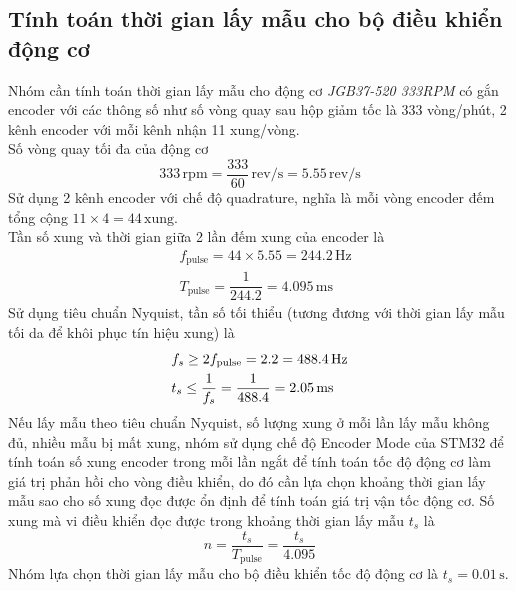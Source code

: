           \subsection{Tính toán thời gian lấy mẫu cho bộ điều khiển động cơ}
               \hspace*{0.6cm}Nhóm cần tính toán thời gian lấy mẫu cho động cơ \textit{JGB37-520 333RPM} có gắn encoder với các thông số như số vòng quay sau 
               hộp giảm tốc là 333 vòng/phút, 2 kênh encoder với mỗi kênh nhận 11 xung/vòng.\\
               Số vòng quay tối đa của động cơ
               \begin{equation*}
                    333 \,\mathrm{rpm} = \dfrac{333}{60} \,\mathrm{rev/s} = 5.55 \,\mathrm{rev/s}
               \end{equation*}
               Sử dụng 2 kênh encoder với chế độ quadrature, nghĩa là mỗi vòng encoder đếm tổng cộng $11 \times 4 = 44 \,\mathrm{xung}$.\\
               Tần số xung và thời gian giữa 2 lần đếm xung của encoder là 
               \begin{align*}
                    &f_{\text{pulse}} = 44 \times 5.55 = 244.2 \,\mathrm{Hz}\\
                    &T_{\text{pulse}} = \dfrac{1}{244.2} = 4.095 \,\mathrm{ms}
               \end{align*}
               Sử dụng tiêu chuẩn Nyquist, tần số tối thiểu (tương đương với thời gian lấy mẫu tối da để khôi phục tín hiệu xung) là 
               \begin{align*}
                    &f_s \geq 2 f_{\text{pulse}} = 2 \time 244.2 = 488.4 \,\mathrm{Hz}\\
                    &t_s \leq \dfrac{1}{f_s} = \dfrac{1}{488.4} = 2.05 \,\mathrm{ms}
               \end{align*}
               Nếu lấy mẫu theo tiêu chuẩn Nyquist, số lượng xung ở mỗi lần lấy mẫu không đủ, nhiều mẫu bị mất xung, nhóm sử dụng chế độ Encoder Mode của STM32 để tính toán
               số xung encoder trong mỗi lần ngắt để tính toán tốc độ động cơ làm giá trị phản hồi cho vòng điều khiển, do đó cần lựa chọn khoảng thời gian lấy mẫu sao cho số xung đọc được 
               ổn định để tính toán giá trị vận tốc động cơ. Số xung mà vi điều khiển đọc được trong khoảng thời gian lấy mẫu $t_s$ là 
               \begin{equation*}
                    n = \dfrac{t_s}{T_{\text{pulse}}} = \dfrac{t_s}{4.095}
               \end{equation*}
               Nhóm lựa chọn thời gian lấy mẫu cho bộ điều khiển tốc độ động cơ là $t_s = 0.01 \,\mathrm{s}$.
